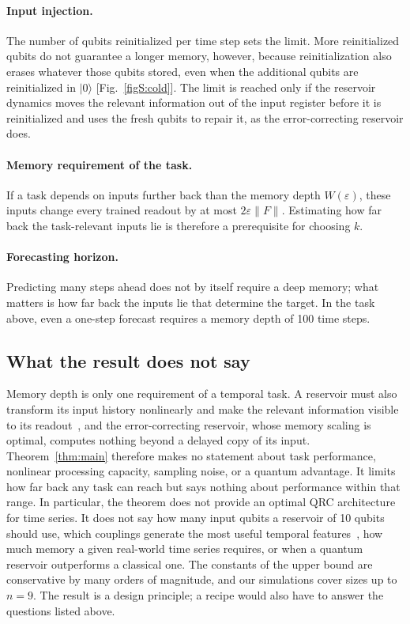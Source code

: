\documentclass[aps,prl,twocolumn,superscriptaddress,floatfix]{revtex4-2}
\theoremstyle{plain}
\newcommand{\ket}[1]{|#1\rangle}
\newcommand{\Norm}[1]{\lVert #1\rVert}
\begin{document}
\paragraph*{Input injection.} The number of qubits reinitialized per time step sets the limit. More reinitialized qubits do not guarantee a longer memory, however, because reinitialization also erases whatever those qubits stored, even when the additional qubits are reinitialized in $\ket0$ [Fig.~\ref{figS:cold}]. The limit is reached only if the reservoir dynamics moves the relevant information out of the input register before it is reinitialized and uses the fresh qubits to repair it, as the error-correcting reservoir does.

\paragraph*{Memory requirement of the task.} If a task depends on inputs further back than the memory depth $W(\varepsilon)$, these inputs change every trained readout by at most $2\varepsilon\Norm F$. Estimating how far back the task-relevant inputs lie is therefore a prerequisite for choosing $k$.

\paragraph*{Forecasting horizon.} Predicting many steps ahead does not by itself require a deep memory; what matters is how far back the inputs lie that determine the target. In the task above, even a one-step forecast requires a memory depth of 100 time steps.

\subsection{What the result does not say}

Memory depth is only one requirement of a temporal task. A reservoir must also transform its input history nonlinearly and make the relevant information visible to its readout~\cite{Cao2026}, and the error-correcting reservoir, whose memory scaling is optimal, computes nothing beyond a delayed copy of its input. Theorem~\ref{thm:main} therefore makes no statement about task performance, nonlinear processing capacity, sampling noise, or a quantum advantage. It limits how far back any task can reach but says nothing about performance within that range. In particular, the theorem does not provide an optimal QRC architecture for time series. It does not say how many input qubits a reservoir of 10 qubits should use, which couplings generate the most useful temporal features~\cite{MartinezPena2021,Cao2026}, how much memory a given real-world time series requires, or when a quantum reservoir outperforms a classical one. The constants of the upper bound are conservative by many orders of magnitude, and our simulations cover sizes up to $n=9$. The result is a design principle; a recipe would also have to answer the questions listed above.
\end{document}
